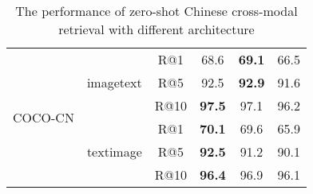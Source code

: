 \documentclass{article}
\begin{document}
\begin{table}[]
\begin{tabular}{@{}cccccc@{}}
\multicolumn{1}{c|}{\multirow{7}{*}{COCO-CN}} & \multirow{3}{*}{imagetext} & \multicolumn{1}{c|}{R@1} & \multicolumn{1}{c|}{68.6} & \multicolumn{1}{c|}{\textbf{69.1}} & \multicolumn{1}{c}{66.5} \\
\multicolumn{1}{c|}{} &  & \multicolumn{1}{c|}{R@5} & \multicolumn{1}{c|}{92.5} & \multicolumn{1}{c|}{\textbf{92.9}} & \multicolumn{1}{c}{91.6}  \\
\multicolumn{1}{c|}{} &  & \multicolumn{1}{c|}{R@10} & \multicolumn{1}{c|}{\textbf{97.5}} & \multicolumn{1}{c|}{97.1} & \multicolumn{1}{c}{96.2}  \\ \cmidrule(l){2-6} 
\multicolumn{1}{c|}{} & \multirow{3}{*}{textimage} & \multicolumn{1}{c|}{R@1} & \multicolumn{1}{c|}{\textbf{70.1}} & \multicolumn{1}{c|}{69.6} & \multicolumn{1}{c}{65.9} \\
\multicolumn{1}{c|}{} &  & \multicolumn{1}{c|}{R@5} & \multicolumn{1}{c|}{\textbf{92.5}} & \multicolumn{1}{c|}{91.2} & \multicolumn{1}{c}{90.1}  \\
\multicolumn{1}{c|}{} &  & \multicolumn{1}{c|}{R@10} & \multicolumn{1}{c|}{\textbf{96.4}} & \multicolumn{1}{c|}{96.9} & \multicolumn{1}{c}{96.1}  \\ \bottomrule
\end{tabular}
\caption{The performance of zero-shot Chinese cross-modal retrieval with different architecture}
\label{details_results}
\end{table}
\end{document}
